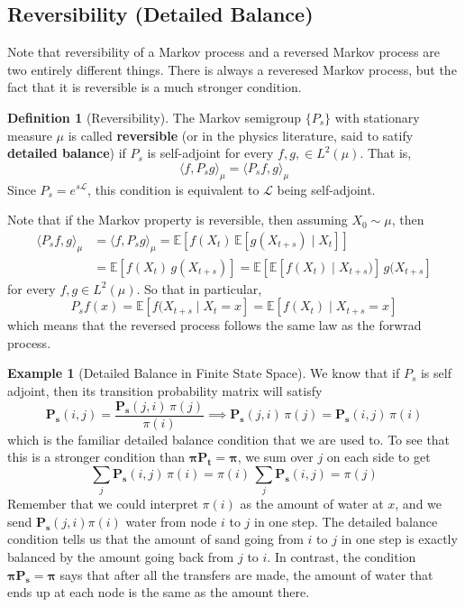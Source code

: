 \documentclass{article}
\theoremstyle{definition}
\newtheorem{example}{Example}[section]
\theoremstyle{remark}
\theoremstyle{definition}
\newtheorem{definition}{Definition}[section]
\begin{document}
\subsection{Reversibility (Detailed Balance)}

Note that reversibility of a Markov process and a reversed Markov process are two entirely different things. There is always a reveresed Markov process, but the fact that it is reversible is a much stronger condition. 

\begin{definition}[Reversibility]
The Markov semigroup $\{P_s\}$ with stationary measure $\mu$ is called \textbf{reversible} (or in the physics literature, said to satify \textbf{detailed balance}) if $P_s$ is self-adjoint for every $f, g, \in L^2 (\mu)$. That is, 
\[\langle f, P_s g \rangle_\mu = \langle P_s f, g \rangle_\mu\]
Since $P_s = e^{s \mathscr{L}}$, this condition is equivalent to $\mathscr{L}$ being self-adjoint.
\end{definition}

Note that if the Markov property is reversible, then assuming $X_0 \sim \mu$, then 
\begin{align*}
    \langle P_s f, g \rangle_\mu & = \langle f, P_s g \rangle_\mu = \mathbb{E}[ f(X_t) \, \mathbb{E}[g(X_{t + s}) \mid X_t]] \\
    & = \mathbb{E}[ f(X_t) \, g(X_{t + s})] = \mathbb{E}[ \mathbb{E}[ f(X_t) \mid X_{t + s})] \, g(X_{t + s}] 
\end{align*}
for every $f, g \in L^2 (\mu)$. So that in particular, 
\[P_s f (x) = \mathbb{E}[f(X_{t + s} \mid X_t = x] = \mathbb{E}[f(X_t) \mid X_{t + s} = x]\]
which means that the reversed process follows the same law as the forwrad process. 

\begin{example}[Detailed Balance in Finite State Space]
We know that if $P_s$ is self adjoint, then its transition probability matrix will satisfy 
\[\mathbf{P_s}(i, j) = \frac{\mathbf{P_s}(j, i) \, \pi(j)}{\pi(i)} \implies \mathbf{P_s}(j, i) \, \pi(j) = \mathbf{P_s}(i, j) \, \pi(i)\]
which is the familiar detailed balance condition that we are used to. To see that this is a stronger condition than $\boldsymbol{\pi} \mathbf{P_t} = \boldsymbol{\pi}$, we sum over $j$ on each side to get 
\[\sum_j \mathbf{P_s}(i, j) \, \pi(i) = \pi(i) \, \sum_j \mathbf{P_s}(i, j) = \pi(j)\]
Remember that we could interpret $\pi(i)$ as the amount of water at $x$, and we send $\mathbf{P_s}(j, i) \pi(i)$ water from node $i$ to $j$ in one step. The detailed balance condition tells us that the amount of sand going from $i$ to $j$ in one step is exactly balanced by the amount going back from $j$ to $i$. In contrast, the condition $\boldsymbol{\pi} \mathbf{P_s} = \boldsymbol{\pi}$ says that after all the transfers are made, the amount of water that ends up at each node is the same as the amount there. 
\end{example}
\end{document}
